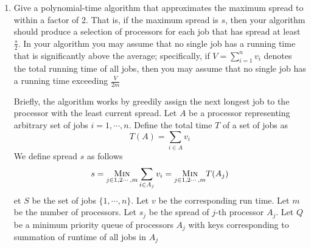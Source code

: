 \documentclass[11pt]{article}
\begin{document}
\begin{enumerate}
    \item Give a polynomial-time algorithm that approximates the maximum spread to within a factor of 2. That is, if the maximum spread is $s$, then your algorithm should produce a selection of processors for each job that has spread at least $\frac{s}{2}$. In your algorithm you may assume that no single job has a running time that is significantly above the average; specifically, if $V = \sum_{i=1}^n v_i$ denotes the total running time of all jobs, then you may assume that no single job has a running time exceeding $\frac{V}{2m}$
    \begin{solution}
        Briefly, the algorithm works by greedily assign the next longest job to the processor with the least current spread. Let $A$ be a processor representing arbitrary set of jobs $i = 1, \cdots, n$. Define the total time $T$ of a set of jobs as 
        \[
            T(A) = \sum_{i\in A} v_i
        \]
         We define spread $s$ as follows
        \[
            s = \underset{j\in 1,2\cdots, m}{\textsc{Min}} \sum_{i\in A_j} v_i = 
            \underset{j\in 1,2\cdots, m}{\textsc{Min}} T(A_j)
        \]
        et $S$ be the set of jobs $\{1,\cdots, n\}$. Let $v$ be the corresponding run time. Let $m$ be the number of processors. Let $s_j$ be the spread of $j$-th processor $A_j$. Let $Q$ be a minimum priority queue of processors $A_j$ with keys corresponding to summation of runtime of all jobs in $A_j$  \\
        \begin{algorithm}[H]

\end{algorithm}
\end{solution}
\end{enumerate}
\end{document}
